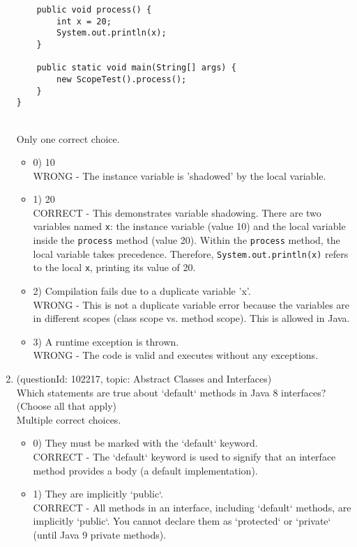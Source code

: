 \documentclass[12pt]{article}
\begin{document}
\begin{enumerate}[label=(\arabic*)]
\begin{verbatim}
    public void process() {
        int x = 20;
        System.out.println(x);
    }

    public static void main(String[] args) {
        new ScopeTest().process();
    }
}
\end{verbatim}
\\ \noindent Only one correct choice. 
\begin{itemize}
\item 0) 10
 \\ 
WRONG - The instance variable is 'shadowed' by the local variable.

\item 1) 20
 \\ 
CORRECT - This demonstrates variable shadowing. There are two variables named \verb|x|: the instance variable (value 10) and the local variable inside the \verb|process| method (value 20). Within the \verb|process| method, the local variable takes precedence. Therefore, \verb|System.out.println(x)| refers to the local \verb|x|, printing its value of 20.

\item 2) Compilation fails due to a duplicate variable 'x'.
 \\ 
WRONG - This is not a duplicate variable error because the variables are in different scopes (class scope vs. method scope). This is allowed in Java.

\item 3) A runtime exception is thrown.
 \\ 
WRONG - The code is valid and executes without any exceptions.

\end{itemize}
\item (questionId: 102217, topic: Abstract Classes and Interfaces) \\ 
Which statements are true about `default` methods in Java 8 interfaces? (Choose all that apply)
\\ \noindent Multiple correct choices. 
\begin{itemize}
\item 0) They must be marked with the `default` keyword.
 \\ 
CORRECT - The `default` keyword is used to signify that an interface method provides a body (a default implementation).

\item 1) They are implicitly `public`.
 \\ 
CORRECT - All methods in an interface, including `default` methods, are implicitly `public`. You cannot declare them as `protected` or `private` (until Java 9 private methods).


\end{itemize}
\end{enumerate}
\end{document}
